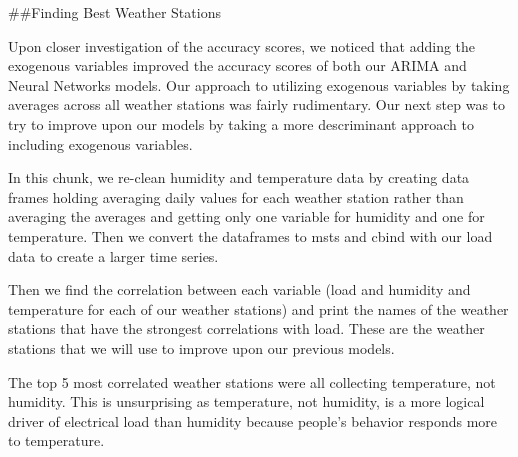 \documentclass[
]{article}
\begin{document}
\#\#Finding Best Weather Stations

Upon closer investigation of the accuracy scores, we noticed that adding
the exogenous variables improved the accuracy scores of both our ARIMA
and Neural Networks models. Our approach to utilizing exogenous
variables by taking averages across all weather stations was fairly
rudimentary. Our next step was to try to improve upon our models by
taking a more descriminant approach to including exogenous variables.

In this chunk, we re-clean humidity and temperature data by creating
data frames holding averaging daily values for each weather station
rather than averaging the averages and getting only one variable for
humidity and one for temperature. Then we convert the dataframes to msts
and cbind with our load data to create a larger time series.

Then we find the correlation between each variable (load and humidity
and temperature for each of our weather stations) and print the names of
the weather stations that have the strongest correlations with load.
These are the weather stations that we will use to improve upon our
previous models.

The top 5 most correlated weather stations were all collecting
temperature, not humidity. This is unsurprising as temperature, not
humidity, is a more logical driver of electrical load than humidity
because people's behavior responds more to temperature.
\end{document}
